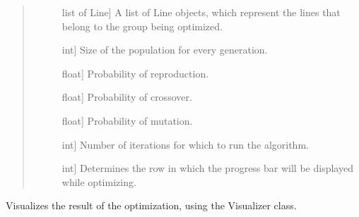 \documentclass[letterpaper,10pt,english,openany,oneside]{sphinxmanual}
\begin{document}
\begin{fulllineitems}
\begin{fulllineitems}
\begin{quote}
\begin{description}
\begin{description}
\item[{}] \leavevmode{[}list of Line{]}
A list of Line objects, which represent the lines that belong to
the group being optimized.

\item[{}] \leavevmode{[}int{]}
Size of the population for every generation.

\item[{}] \leavevmode{[}float{]}
Probability of reproduction.

\item[{}] \leavevmode{[}float{]}
Probability of crossover.

\item[{}] \leavevmode{[}float{]}
Probability of mutation.

\item[{}] \leavevmode{[}int{]}
Number of iterations for which to run the algorithm.

\item[{}] \leavevmode{[}int{]}
Determines the row in which the progress bar will be displayed
while optimizing.

\end{description}

\end{description}\end{quote}

\end{fulllineitems}


\begin{fulllineitems}
\label{\detokenize{reference:cnc.optimization.CNCOptimizer.visualize}}
Visualizes the result of the optimization, using the Visualizer class.

\end{fulllineitems}


\end{fulllineitems}

\end{document}
